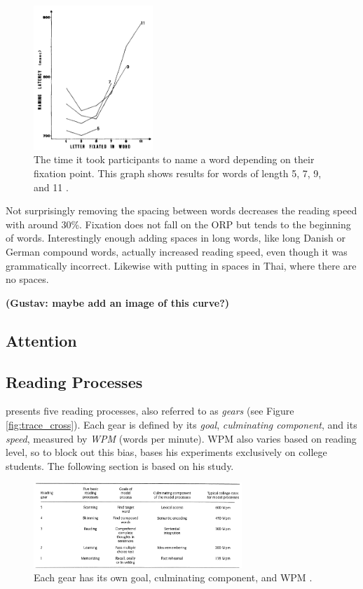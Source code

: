 \begin{figure}[htbp]
\centering
\includegraphics[width=0.4\textwidth]{Pics/ucurve}
\caption{The time it took participants to name a word depending on their fixation point. This graph shows results for words of length 5, 7, 9, and 11 \protect\cite{oregan_convenient_1984}.}
\label{fig:ucurve}
\end{figure}

Not surprisingly removing the spacing between words decreases the reading speed with around 30\%. Fixation does not fall on the ORP but tends to the beginning of words. Interestingly enough adding spaces in long words, like long Danish or German compound words, actually increased reading speed, even though it was grammatically incorrect. Likewise with putting in spaces in Thai, where there are no spaces.

\textbf{(Gustav: maybe add an image of this curve?)}

\subsection{Attention}

\subsection{Reading Processes}
 presents five reading processes, also referred to as \textit{gears} (see Figure \ref{fig:trace_cross}). Each gear is defined by its \textit{goal}, \textit{culminating component}, and its \textit{speed}, measured by \textit{WPM} (words per minute). WPM also varies based on reading level, so to block out this bias, \citeauthor{carver_reading_1992} bases his experiments exclusively on college students. The following section is based on his study.

\begin{figure}[htbp]
\centering
\captionsetup{justification=centering}
\includegraphics[width=0.7\textwidth]{Pics/gears_list}
\caption{Each gear has its own goal, culminating component, and WPM \protect\cite{carver_reading_1992}.}
\label{fig:gears_list}
\end{figure}

